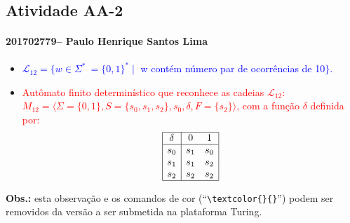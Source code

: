 \documentclass[12pt]{article}
\def\discente{Paulo Henrique Santos Lima}
\def\matricula{201702779}
\def\aa{2}
\def\myling{12} %
\begin{document}
\subsection*{Atividade AA-\aa}
 \paragraph{\matricula -- \discente}
%
 \begin{itemize}
  \item \textcolor{blue}{$\mathcal{L}_\myling = \{w\in\Sigma^*\ = \{0,1\}^*\mid$  w contém número par de ocorrências de 10$\}$.}
%
  \item  \textcolor{red}{Autômato finito determinístico que reconhece as cadeias $\mathcal{L}_\myling$:\\
  $M_\myling=\langle\Sigma=\{0,1\},S=\{s_0,s_1,s_2\},s_0,\delta,F=\{s_2\}\rangle$, com a função $\delta$ definida por:\\
  $$\begin{array}{|c|cc|}
   \hline
   \delta & 0   & 1\\
   \hline
      s_0 & s_1 & s_0\\
      s_1 & s_1 & s_2\\
      s_2 & s_2 & s_2\\
   \hline
  \end{array}$$}
 \end{itemize}
%
\begin{center}
\end{center}
%

\noindent\textbf{Obs.:} esta observação e os comandos de cor (``\verb|\textcolor{}{}|'') podem ser removidos da versão a ser submetida na plataforma Turing.
\end{document}
